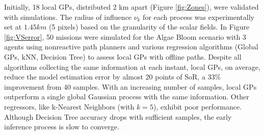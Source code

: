 \documentclass[journal]{IEEEtran}
\newcommand\changes[1]{\textcolor{black}{#1}}
\begin{document}

Initially, 18 local GPs, distributed 2 km apart (Figure \ref{fig:Zones}), were validated with simulations. The radius of influence $\nu_k$ for each process was experimentally set at $1.45 km$ (5 pixels) based on the granularity of the scalar fields. In Figure \ref{fig:VSerror}, 50 missions were simulated for the Algae Bloom scenario with 3 agents using nonreactive path planners and various regression algorithms (Global GPs, kNN, Decision Tree) to assess local GPs with offline paths. Despite all algorithms collecting the same information at each instant, local GPs, on average, reduce the model estimation error by almost 20 points of SoR, a 33\% improvement from 40 samples. With an increasing number of samples, local GPs outperform a single global Gaussian process with the same information. Other regressors, like k-Nearest Neighbors (with $k = 5$), exhibit poor performance. Although Decision Tree accuracy drops with sufficient samples, the early inference process is slow to converge.
\end{document}

